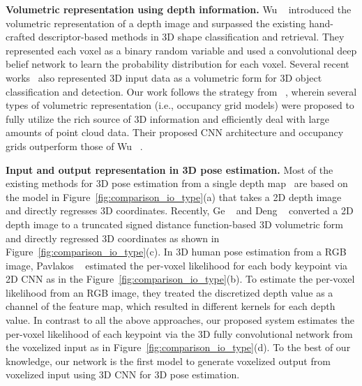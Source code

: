 {\bf Volumetric representation using depth information.}
Wu \etal~\cite{wu20153d} introduced the volumetric representation of a depth image and surpassed the existing hand-crafted descriptor-based methods in 3D shape classification and retrieval. They represented each voxel as a binary random variable and used a convolutional deep belief network to learn the probability distribution for each voxel. Several recent works~\cite{maturana2015voxnet,song2016deep} also represented 3D input data as a volumetric form for 3D object classification and detection. Our work follows the strategy from ~\cite{maturana2015voxnet}, wherein several types of volumetric representation (i.e., occupancy grid models) were proposed to fully utilize the rich source of 3D information and efficiently deal with large amounts of point cloud data. Their proposed CNN architecture and occupancy grids outperform those of Wu \etal~\cite{wu20153d}.

{\bf Input and output representation in 3D pose estimation.}
Most of the existing methods for 3D pose estimation from a single depth map~\cite{oberweger2015hands,oberweger2015training,bouchacourt2016disco,Wan_2017_CVPR,guo2017ren,guo2017towards,Oberweger_2017_ICCV_Workshops,chen2017pose,madadi2017end,fourure2017multi,haque2016towards} are based on the model in Figure~\ref{fig:comparison_io_type}(a) that takes a 2D depth image and directly regresses 3D coordinates. Recently, Ge \etal~\cite{ge20173d} and Deng \etal~\cite{deng2017hand3d} converted a 2D depth image to a truncated signed distance function-based 3D volumetric form and directly regressed 3D coordinates as shown in Figure~\ref{fig:comparison_io_type}(c). In 3D human pose estimation from a RGB image, Pavlakos \etal~\cite{pavlakos2016coarse} estimated the per-voxel likelihood for each body keypoint via 2D CNN as in the Figure~\ref{fig:comparison_io_type}(b). To estimate the per-voxel likelihood from an RGB image, they treated the discretized depth value as a channel of the feature map, which resulted in different kernels for each depth value. In contrast to all the above approaches, our proposed system estimates the per-voxel likelihood of each keypoint via the 3D fully convolutional network from the voxelized input as in Figure~\ref{fig:comparison_io_type}(d). To the best of our knowledge, our network is the first model to generate voxelized output from voxelized input using 3D CNN for 3D pose estimation.








